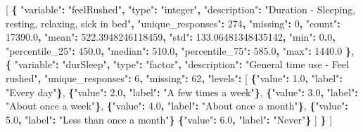 \documentclass[
]{article}
\newenvironment{Shaded}{\begin{snugshade}}{\end{snugshade}}
\newcommand{\DataTypeTok}[1]{\textcolor[rgb]{0.13,0.29,0.53}{#1}}
\newcommand{\DecValTok}[1]{\textcolor[rgb]{0.00,0.00,0.81}{#1}}
\newcommand{\ErrorTok}[1]{\textcolor[rgb]{0.64,0.00,0.00}{\textbf{#1}}}
\newcommand{\FloatTok}[1]{\textcolor[rgb]{0.00,0.00,0.81}{#1}}
\newcommand{\FunctionTok}[1]{\textcolor[rgb]{0.13,0.29,0.53}{\textbf{#1}}}
\newcommand{\OtherTok}[1]{\textcolor[rgb]{0.56,0.35,0.01}{#1}}
\newcommand{\StringTok}[1]{\textcolor[rgb]{0.31,0.60,0.02}{#1}}
\begin{document}
\begin{itemize}
\begin{Shaded}
\begin{Highlighting}[]
  \OtherTok{[}
  \FunctionTok{\{}
    \DataTypeTok{"variable"}\FunctionTok{:} \StringTok{"feelRushed"}\FunctionTok{,}
    \DataTypeTok{"type"}\FunctionTok{:} \StringTok{"integer"}\FunctionTok{,}
    \DataTypeTok{"description"}\FunctionTok{:} \StringTok{"Duration {-} Sleeping, resting, relaxing, sick in bed"}\FunctionTok{,}
    \DataTypeTok{"unique\_responses"}\FunctionTok{:} \DecValTok{274}\FunctionTok{,}
    \DataTypeTok{"missing"}\FunctionTok{:} \DecValTok{0}\FunctionTok{,}
    \DataTypeTok{"count"}\FunctionTok{:} \FloatTok{17390.0}\FunctionTok{,}
    \DataTypeTok{"mean"}\FunctionTok{:} \FloatTok{522.3948246118459}\FunctionTok{,}
    \DataTypeTok{"std"}\FunctionTok{:} \FloatTok{133.06481348435142}\FunctionTok{,}
    \DataTypeTok{"min"}\FunctionTok{:} \DecValTok{0}\ErrorTok{.}\DecValTok{0}\FunctionTok{,}
    \DataTypeTok{"percentile\_25"}\FunctionTok{:} \FloatTok{450.0}\FunctionTok{,}
    \DataTypeTok{"median"}\FunctionTok{:} \FloatTok{510.0}\FunctionTok{,}
    \DataTypeTok{"percentile\_75"}\FunctionTok{:} \FloatTok{585.0}\FunctionTok{,}
    \DataTypeTok{"max"}\FunctionTok{:} \FloatTok{1440.0}
  \FunctionTok{\}}\OtherTok{,}
  \FunctionTok{\{}
    \DataTypeTok{"variable"}\FunctionTok{:} \StringTok{"durSleep"}\FunctionTok{,}
    \DataTypeTok{"type"}\FunctionTok{:} \StringTok{"factor"}\FunctionTok{,}
    \DataTypeTok{"description"}\FunctionTok{:} \StringTok{"General time use {-} Feel rushed"}\FunctionTok{,}
    \DataTypeTok{"unique\_responses"}\FunctionTok{:} \DecValTok{6}\FunctionTok{,}
    \DataTypeTok{"missing"}\FunctionTok{:} \DecValTok{62}\FunctionTok{,}
    \DataTypeTok{"levels"}\FunctionTok{:} \OtherTok{[}
      \FunctionTok{\{}\DataTypeTok{"value"}\FunctionTok{:} \FloatTok{1.0}\FunctionTok{,} \DataTypeTok{"label"}\FunctionTok{:} \StringTok{"Every day"}\FunctionTok{\}}\OtherTok{,}
      \FunctionTok{\{}\DataTypeTok{"value"}\FunctionTok{:} \FloatTok{2.0}\FunctionTok{,} \DataTypeTok{"label"}\FunctionTok{:} \StringTok{"A few times a week"}\FunctionTok{\}}\OtherTok{,}
      \FunctionTok{\{}\DataTypeTok{"value"}\FunctionTok{:} \FloatTok{3.0}\FunctionTok{,} \DataTypeTok{"label"}\FunctionTok{:} \StringTok{"About once a week"}\FunctionTok{\}}\OtherTok{,}
      \FunctionTok{\{}\DataTypeTok{"value"}\FunctionTok{:} \FloatTok{4.0}\FunctionTok{,} \DataTypeTok{"label"}\FunctionTok{:} \StringTok{"About once a month"}\FunctionTok{\}}\OtherTok{,}
      \FunctionTok{\{}\DataTypeTok{"value"}\FunctionTok{:} \FloatTok{5.0}\FunctionTok{,} \DataTypeTok{"label"}\FunctionTok{:} \StringTok{"Less than once a month"}\FunctionTok{\}}
      \FunctionTok{\{}\DataTypeTok{"value"}\FunctionTok{:} \FloatTok{6.0}\FunctionTok{,} \DataTypeTok{"label"}\FunctionTok{:} \StringTok{"Never"}\FunctionTok{\}}      
    \OtherTok{]}
  \FunctionTok{\}}
\OtherTok{]}
\end{Highlighting}
\end{Shaded}


\end{itemize}
\end{document}
